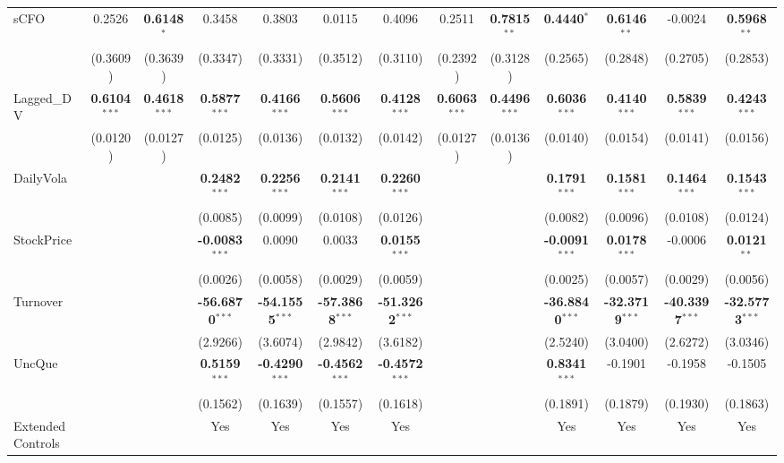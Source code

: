 \begin{landscape}
\begin{table}[H]
\begin{tabular}{lcccccccccccc}
sCFO & 0.2526 & \textbf{0.6148}$^{*}$ & 0.3458 & 0.3803 & 0.0115 & 0.4096 & 0.2511 & \textbf{0.7815}$^{**}$ & \textbf{0.4440}$^{*}$ & \textbf{0.6146}$^{**}$ & -0.0024 & \textbf{0.5968}$^{**}$ \\
 & (0.3609) & (0.3639) & (0.3347) & (0.3331) & (0.3512) & (0.3110) & (0.2392) & (0.3128) & (0.2565) & (0.2848) & (0.2705) & (0.2853) \\
Lagged\_DV & \textbf{0.6104}$^{***}$ & \textbf{0.4618}$^{***}$ & \textbf{0.5877}$^{***}$ & \textbf{0.4166}$^{***}$ & \textbf{0.5606}$^{***}$ & \textbf{0.4128}$^{***}$ & \textbf{0.6063}$^{***}$ & \textbf{0.4496}$^{***}$ & \textbf{0.6036}$^{***}$ & \textbf{0.4140}$^{***}$ & \textbf{0.5839}$^{***}$ & \textbf{0.4243}$^{***}$ \\
 & (0.0120) & (0.0127) & (0.0125) & (0.0136) & (0.0132) & (0.0142) & (0.0127) & (0.0136) & (0.0140) & (0.0154) & (0.0141) & (0.0156) \\
DailyVola &  &  & \textbf{0.2482}$^{***}$ & \textbf{0.2256}$^{***}$ & \textbf{0.2141}$^{***}$ & \textbf{0.2260}$^{***}$ &  &  & \textbf{0.1791}$^{***}$ & \textbf{0.1581}$^{***}$ & \textbf{0.1464}$^{***}$ & \textbf{0.1543}$^{***}$ \\
 &  &  & (0.0085) & (0.0099) & (0.0108) & (0.0126) &  &  & (0.0082) & (0.0096) & (0.0108) & (0.0124) \\
StockPrice &  &  & \textbf{-0.0083}$^{***}$ & 0.0090 & 0.0033 & \textbf{0.0155}$^{***}$ &  &  & \textbf{-0.0091}$^{***}$ & \textbf{0.0178}$^{***}$ & -0.0006 & \textbf{0.0121}$^{**}$ \\
 &  &  & (0.0026) & (0.0058) & (0.0029) & (0.0059) &  &  & (0.0025) & (0.0057) & (0.0029) & (0.0056) \\
Turnover &  &  & \textbf{-56.6870}$^{***}$ & \textbf{-54.1555}$^{***}$ & \textbf{-57.3868}$^{***}$ & \textbf{-51.3262}$^{***}$ &  &  & \textbf{-36.8840}$^{***}$ & \textbf{-32.3719}$^{***}$ & \textbf{-40.3397}$^{***}$ & \textbf{-32.5773}$^{***}$ \\
 &  &  & (2.9266) & (3.6074) & (2.9842) & (3.6182) &  &  & (2.5240) & (3.0400) & (2.6272) & (3.0346) \\
UncQue &  &  & \textbf{0.5159}$^{***}$ & \textbf{-0.4290}$^{***}$ & \textbf{-0.4562}$^{***}$ & \textbf{-0.4572}$^{***}$ &  &  & \textbf{0.8341}$^{***}$ & -0.1901 & -0.1958 & -0.1505 \\
 &  &  & (0.1562) & (0.1639) & (0.1557) & (0.1618) &  &  & (0.1891) & (0.1879) & (0.1930) & (0.1863) \\
\midrule
Extended Controls &  &  & Yes & Yes & Yes & Yes &  &  & Yes & Yes & Yes & Yes \\

\end{tabular}
\end{table}
\end{landscape}
